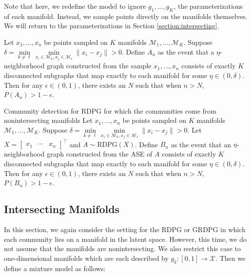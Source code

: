 \documentclass[12pt]{article}
\begin{document}
Note that here, we redefine the model to ignore \(g_1, ..., g_K\), the
parameterizations of each manifold. Instead, we sample points directly
on the manifolds themselves. We will return to the parameterizations in
Section \ref{section:intersecting}.

\begin{theorem}
\label{nonintersect-no-noise}
Let $x_1, ..., x_n$ be points sampled on $K$ manifolds $\mathcal{M}_1, ..., \mathcal{M}_K$. 
Suppose $\delta = \min\limits_{k \neq \ell} \min\limits_{x_i \in \mathcal{M}_k, x_j \in \mathcal{M}_\ell} \| x_i - x_j \| > 0$. 
Define $A_n$ as the event that a $\eta$-neighborhood graph constructed from the sample $x_1, ..., x_n$ consists of exactly $K$ disconnected subgraphs that map exactly to each manifold for some $\eta \in (0, \delta)$. 
Then for any $\epsilon \in (0, 1)$, there exists an $N$ such that when $n > N$, $P(A_n) > 1 - \epsilon$. 
\end{theorem}

\begin{theorem}{Community detection for RDPG for which the communities come from nonintersecting manifolds}
\label{nonintersect-rdpg}
Let $x_1, ..., x_n$ be points sampled on $K$ manifolds $\mathcal{M}_1, ..., \mathcal{M}_K$. 
Suppose $\delta = \min\limits_{k \neq \ell} \min\limits_{x_i \in \mathcal{M}_k, x_j \in \mathcal{M}_\ell} \| x_i - x_j \| > 0$. 
Let $X = \begin{bmatrix} x_1 & \cdots & x_n \end{bmatrix}^\top$ and $A \sim \mathrm{RDPG}(X)$. 
Define $B_n$ as the event that an $\eta$-neighborhood graph constructed from the ASE of $A$ consists of exactly $K$ disconnected subgraphs that map exactly to each manifold for some $\eta \in (0, \delta)$. 
Then for any $\epsilon \in (0, 1)$, there exists an $N$ such that when $n > N$, $P(B_n) > 1 - \epsilon$. 
\end{theorem}

\hypertarget{intersecting-manifolds}{%
\subsection{Intersecting Manifolds}\label{intersecting-manifolds}}

\label{section:intersecting}

In this section, we again consider the setting for the RDPG or GRDPG in
which each community lies on a manifold in the latent space. However,
this time, we do not assume that the manifolds are nonintersecting. We
also restrict this case to one-dimensional manifolds which are each
described by \(g_k : [0, 1] \to \mathcal{X}\). Then we define a mixture
model as follows:
\end{document}
